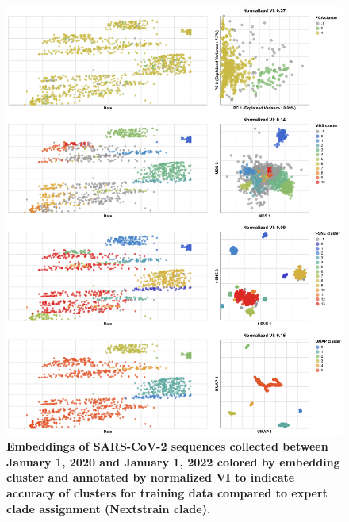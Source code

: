 \documentclass[10pt,letterpaper]{article}
\begin{document}
\begin{figure}[!h]
\includegraphics[width=\columnwidth]{figures/sarscov2-embeddings-by-cluster-vs-Nextstrain_clade.png}
\caption{{\bf Embeddings of SARS-CoV-2 sequences collected between January 1, 2020 and January 1, 2022 colored by embedding cluster and annotated by normalized VI to indicate accuracy of clusters for training data compared to expert clade assignment (Nextstrain clade).}
}
\label{fig:sars-cov-2-2020-2022-clusters-vs-Nextstrain-clade}
\end{figure}
\end{document}
